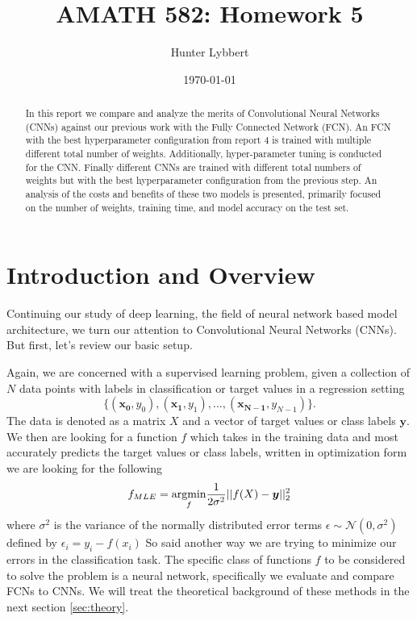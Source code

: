 \documentclass[11pt]{amsart}
\title{AMATH 582: Homework 5}
\author{Hunter Lybbert} %
\date{\today} %
\begin{document}
\maketitle

\begin{abstract}
    In this report we compare and analyze the merits of Convolutional Neural Networks (CNNs) against our previous work with the Fully Connected Network (FCN).
    An FCN with the best hyperparameter configuration from report 4 is trained with multiple different total number of weights.
    Additionally, hyper-parameter tuning is conducted for the CNN.
    Finally different CNNs are trained with different total numbers of weights but with the best hyperparameter configuration from the previous step.
    An analysis of the costs and benefits of these two models is presented, primarily focused on the number of weights, training time, and model accuracy on the test set.
\end{abstract}

\section{Introduction and Overview}\label{sec:Introduction}
Continuing our study of deep learning, the field of neural network based model architecture, we turn our attention to Convolutional Neural Networks (CNNs).
But first, let's review our basic setup.

Again, we are concerned with a supervised learning problem, given a collection of $N$ data points with labels in classification or target values in a regression setting $$\big\{(\bm{x_0}, y_0), (\bm{x_1}, y_1), ..., (\bm{x_{N-1}}, y_{N-1})\big\}.$$
The data is denoted as a matrix $X$ and a vector of target values or class labels $\bm y$.
We then are looking for a function $f$ which takes in the training data and most accurately predicts the target values or class labels, written in optimization form we are looking for the following
\begin{equation}
f_{MLE} = \underset{f}{\rm argmin } \frac 1 {2 \sigma^2}|| f(X) - \bm y ||_2^2
\label{eq:basic_ml_setup}
\end{equation}
where $\sigma^2$ is the variance of the normally distributed error terms $\epsilon \sim \mathcal N (0, \sigma^2)$ defined by $\epsilon_i = y_i - f(x_i)$
So said another way we are trying to minimize our errors in the classification task.
The specific class of functions $f$ to be considered to solve the problem is a neural network, specifically we evaluate and compare FCNs to CNNs.
We will treat the theoretical background of these methods in the next section \ref{sec:theory}.
\end{document}
